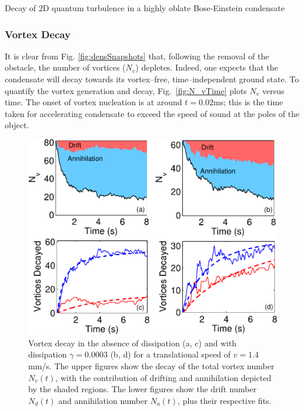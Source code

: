 \begin{chapter}{\label{cha:shin}Decay of 2D quantum turbulence in a highly oblate Bose-Einstein condensate}
\subsubsection{Vortex Decay}
It is clear from Fig. \ref{fig:densSnapshots} that, following the removal 
of the obstacle, the number of vortices ($N_v$) depletes.   
Indeed, one expects that the condensate will decay towards its 
vortex--free, time--independent ground state.  To quantify the vortex generation and
decay, Fig.~\ref{fig:N_vTime} plots $N_v$ versus time. 
The onset of vortex nucleation is at around $t=0.02$ms; 
this is the time taken for accelerating condensate to exceed the speed of 
sound at the poles of the object.
\begin{figure}
\begin{minipage}{0.6\textwidth}
\centering
\includegraphics[width=0.9\linewidth]{shin/fig4}
\end{minipage} \hfill
\begin{minipage}{0.4\textwidth}
\caption{\label{fig:N_vLong} Vortex decay in the absence of dissipation (a, c) and with dissipation $\gamma=0.0003$ (b, d) for a translational speed of $v=1.4$mm/s.  The upper figures show the decay of the total vortex number $N_v(t)$, with the contribution of drifting and annihilation depicted by the shaded regions.  The lower figures show the drift number $N_d(t)$ and annihilation number $N_a(t)$, plus their respective fits.}
\end{minipage} \hfill
\end{figure}


\end{chapter}
